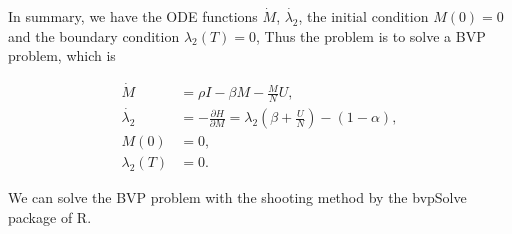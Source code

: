 In summary, we have the ODE functions $\dot{M}$, $\dot{\lambda_{2}}$,
the initial condition $M(0)=0$ and the boundary condition $\lambda_{2}(T)=0$,
Thus the problem is to solve a BVP problem,
which is
\begin{small}
\begin{equation}
\label{eq:bvp}
\begin{aligned}
\dot{M} &= \rho I  - \beta M - \frac{M}{N} U,\\
\dot{\lambda_{2}} &= - \frac{ \partial H}{ \partial M} = \lambda_{2} (\beta + \frac{U}{N} ) - (1-\alpha),\\
M(0) &= 0,\\
\lambda_{2}(T) &= 0.
\end{aligned}
\end{equation}
\end{small}
We can solve the BVP problem with the shooting method by the bvpSolve package of R.

